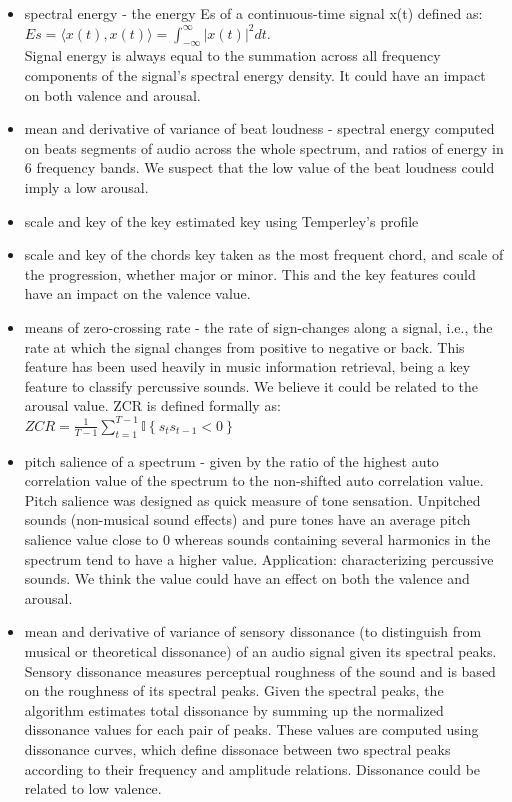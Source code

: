 \begin{itemize}
\item spectral energy - the energy E{s} of a continuous-time signal x(t) defined as: \\
$ E{s}  =  \langle x(t), x(t)\rangle =  \int_{-\infty}^{\infty}{|x(t)|^2}dt $. \\
Signal energy is always equal to the summation across all frequency components of the signal's spectral energy density. It could have an impact on both valence and arousal.

\item mean and derivative of variance of beat loudness -  spectral energy computed on beats segments of audio across the whole spectrum, and ratios of energy in 6 frequency bands. We suspect that the low value of the beat loudness could imply a low arousal.

\item scale and key of the key estimated key using Temperley’s profile

\item scale and key of the chords key taken as the most frequent chord, and scale of the progression, whether major or minor. This and the key features could have an impact on the valence value.

\item means of zero-crossing rate - the rate of sign-changes along a signal, i.e., the rate at which the signal changes from positive to negative or back. This feature has been used heavily in music information retrieval, being a key feature to classify percussive sounds. We believe it could be related to the arousal value.
ZCR is defined formally as: \\
$ZCR = \frac{1}{T-1} \sum_{t=1}^{T-1} {{\mathbb I}\left\{{s_t s_{t-1} < 0}\right\}}$

\item pitch salience of a spectrum - given by the ratio of the highest auto correlation value of the spectrum to the non-shifted auto correlation value. Pitch salience was designed as quick measure of tone sensation. Unpitched sounds (non-musical sound effects) and pure tones have an average pitch salience value close to 0 whereas sounds containing several harmonics in the spectrum tend to have a higher value. Application: characterizing percussive sounds. We think the value could have an effect on both the valence and arousal.

\item mean and derivative of variance of sensory dissonance (to distinguish from musical or theoretical dissonance) of an audio signal given its spectral peaks. Sensory dissonance measures perceptual roughness of the sound and is based on the roughness of its spectral peaks. Given the spectral peaks, the algorithm estimates total dissonance by summing up the normalized dissonance values for each pair of peaks. These values are computed using dissonance curves, which define dissonace between two spectral peaks according to their frequency and amplitude relations. Dissonance could be related to low valence.

\end{itemize}

